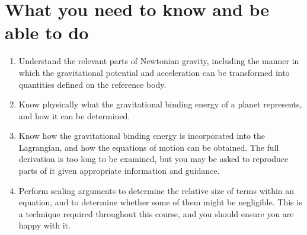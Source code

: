 \section*{What you need to know and be able to do}
\begin{enumerate}
    \item[(i)] Understand the relevant parts of Newtonian gravity, including the manner in which the gravitational potential 
    and acceleration can be transformed into quantities defined on the reference body.
    \item[(ii)] Know physically what the gravitational binding energy of a planet represents, and how it can be determined.
    \item[(iii)] Know how the gravitational binding energy is incorporated into the Lagrangian, and how the equations of 
    motion can be obtained. The full derivation is too long to be examined, but you may be asked to reproduce parts of it 
    given appropriate information and guidance.
    \item[(iv)] Perform scaling arguments to determine the relative size of terms within an equation, and to determine 
    whether some of them might be negligible. This is a technique required throughout this course, and you should ensure you are happy with it.
\end{enumerate}
